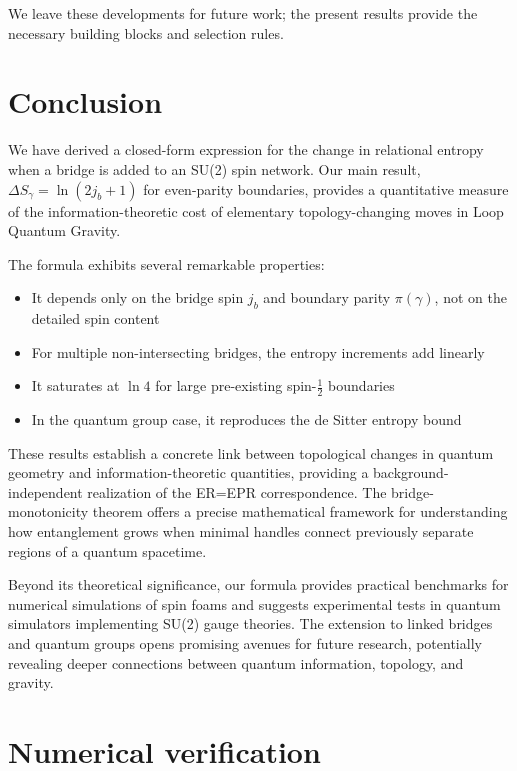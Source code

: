 \documentclass[11pt, a4paper]{article}
\theoremstyle{plain}
\theoremstyle{definition}
\theoremstyle{remark}
\begin{document}
We leave these developments for future work; the present results provide the necessary building blocks and selection rules.

\section{Conclusion}

We have derived a closed-form expression for the change in relational entropy when a bridge is added to an SU(2) spin network. Our main result, $\Delta S_{\gamma} = \ln(2j_b+1)$ for even-parity boundaries, provides a quantitative measure of the information-theoretic cost of elementary topology-changing moves in Loop Quantum Gravity.

The formula exhibits several remarkable properties:
\begin{itemize}
  \item It depends only on the bridge spin $j_b$ and boundary parity $\pi(\gamma)$, not on the detailed spin content
  \item For multiple non-intersecting bridges, the entropy increments add linearly
  \item It saturates at $\ln 4$ for large pre-existing spin-$\frac{1}{2}$ boundaries
  \item In the quantum group case, it reproduces the de Sitter entropy bound
\end{itemize}

These results establish a concrete link between topological changes in quantum geometry and information-theoretic quantities, providing a background-independent realization of the ER=EPR correspondence. The bridge-monotonicity theorem offers a precise mathematical framework for understanding how entanglement grows when minimal handles connect previously separate regions of a quantum spacetime.

Beyond its theoretical significance, our formula provides practical benchmarks for numerical simulations of spin foams and suggests experimental tests in quantum simulators implementing SU(2) gauge theories. The extension to linked bridges and quantum groups opens promising avenues for future research, potentially revealing deeper connections between quantum information, topology, and gravity.

\appendix
\section{Numerical verification}
\label{app:numerical}
\end{document}
